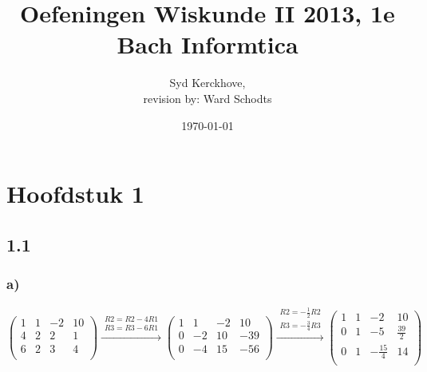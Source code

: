 \documentclass[11pt]{article}
\title{Oefeningen Wiskunde II 2013, 1e Bach Informtica}
\author{Syd Kerckhove, \\revision by: Ward Schodts}
\date{\today}
\begin{document}
\maketitle
\section*{Hoofdstuk 1}
\subsection*{1.1}
\subsubsection*{a)}

\[
\begin{pmatrix}
  1 & 1 & -2 & 10 \\
  4 & 2 & 2 & 1 \\
  6 & 2 & 3 & 4  \\
 \end{pmatrix} 
 \overset{\begin{matrix}
  R2 = R2-4R1 \\
  R3 = R3-6R1
 \end{matrix}}{\rightarrow} 
 \begin{pmatrix}
  1 & 1 & -2 & 10 \\
  0 & -2 & 10 & -39 \\
  0 & -4 & 15 & -56  \\
 \end{pmatrix}
 \overset{\begin{matrix}
  R2 = -\frac{1}{2}R2 \\
  R3 = -\frac{3}{4}R3
 \end{matrix}}{\rightarrow} 
 \begin{pmatrix}
  1 & 1 & -2 & 10 \\
  0 & 1 & -5 & \frac{39}{2} \\
  0 & 1 & -\frac{15}{4} & 14  \\
 \end{pmatrix}
\]
\end{document}
